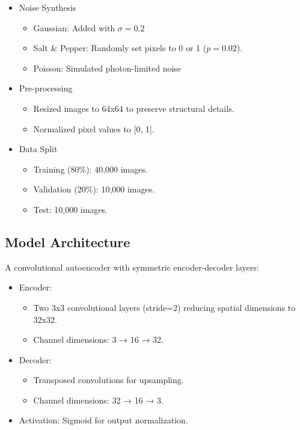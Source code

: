 \documentclass[final]{article}
\begin{document}
\begin{itemize}
    \item Noise Synthesis \begin{itemize}
            \item Gaussian: Added with $\sigma = 0.2$
            \item Salt \& Pepper: Randomly set pixels to 0 or 1 ($p = 0.02$).
            \item Poisson: Simulated photon-limited noise \end{itemize}
    \item Pre-processing
        \begin{itemize}
            \item Resized images to 64x64 to preserve structural details.
            \item Normalized pixel values to [0, 1].
        \end{itemize}
    \item Data Split
    \begin{itemize}
        \item Training (80\%): 40,000 images.
        \item Validation (20\%): 10,000 images.
        \item Test: 10,000 images.
    \end{itemize}
\end{itemize}

\subsection{Model Architecture}

A convolutional autoencoder with symmetric encoder-decoder layers:
\begin{itemize}
    \item Encoder:
    \begin{itemize}
        \item Two 3x3 convolutional layers (stride=2) reducing spatial dimensions to 32x32.
        \item Channel dimensions: 3 → 16 → 32.
    \end{itemize}
    \item Decoder:
    \begin{itemize}
        \item Transposed convolutions for upsampling.
        \item Channel dimensions: 32 → 16 → 3.
    \end{itemize}
    \item Activation: Sigmoid for output normalization.
\end{itemize}
\end{document}
